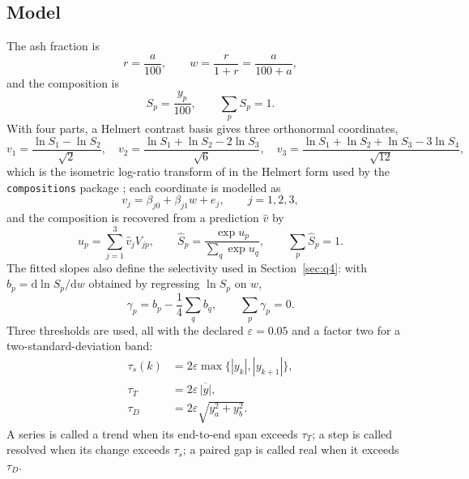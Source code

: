 \documentclass[withoutpreface,bwprint]{apmcmthesis}
\begin{document}
\subsection{Model}
The ash fraction is
\begin{equation}
r=\frac{a}{100},\qquad w=\frac{r}{1+r}=\frac{a}{100+a},
\label{eq:w}
\end{equation}
and the composition is
\begin{equation}
S_p=\frac{y_p}{100},\qquad \sum_{p}S_p=1 .
\label{eq:S}
\end{equation}
With four parts, a Helmert contrast basis gives three orthonormal coordinates,
\begin{equation}
v_1=\frac{\ln S_1-\ln S_2}{\sqrt{2}},\quad
v_2=\frac{\ln S_1+\ln S_2-2\ln S_3}{\sqrt{6}},\quad
v_3=\frac{\ln S_1+\ln S_2+\ln S_3-3\ln S_4}{\sqrt{12}},
\label{eq:ilr}
\end{equation}
which is the isometric log-ratio transform of \cite{Egozcue2003} in the Helmert form used by the \texttt{compositions} package \cite{Boogaart2008}; each coordinate is modelled as
\begin{equation}
v_j=\beta_{j0}+\beta_{j1}w+e_j,\qquad j=1,2,3,
\label{eq:fit}
\end{equation}
and the composition is recovered from a prediction $\hat v$ by
\begin{equation}
u_p=\sum_{j=1}^{3}\hat v_j V_{jp},\qquad
\hat S_p=\frac{\exp u_p}{\sum_{q}\exp u_q},\qquad \sum_p \hat S_p=1 .
\label{eq:inv}
\end{equation}
The fitted slopes also define the selectivity used in Section~\ref{sec:q4}: with $b_p=\mathrm{d}\ln S_p/\mathrm{d}w$ obtained by regressing $\ln S_p$ on $w$,
\begin{equation}
\gamma_p=b_p-\frac{1}{4}\sum_q b_q,\qquad \sum_p\gamma_p=0 .
\label{eq:gamma}
\end{equation}
Three thresholds are used, all with the declared $\varepsilon=0.05$ and a factor two for a two-standard-deviation band:
\begin{align}
\tau_{s}(k)&=2\varepsilon\max\{|y_k|,|y_{k+1}|\},\label{eq:step}\\
\tau_{T}&=2\varepsilon\,\overline{|y|},\label{eq:trend}\\
\tau_{D}&=2\varepsilon\sqrt{y_a^2+y_b^2}.\label{eq:diff}
\end{align}
A series is called a trend when its end-to-end span exceeds $\tau_{T}$; a step is called resolved when its change exceeds $\tau_{s}$; a paired gap is called real when it exceeds $\tau_{D}$.
\end{document}
